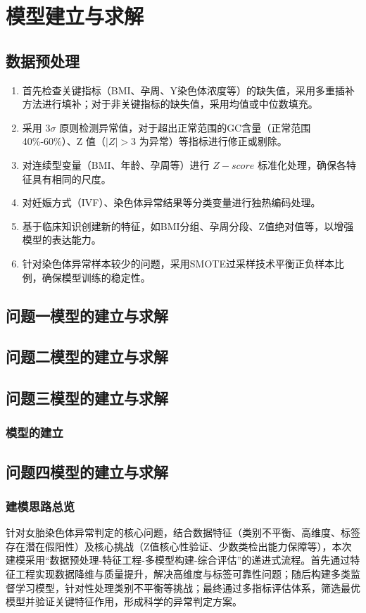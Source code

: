 \documentclass[withoutpreface,bwprint]{cumcmthesis} %
\begin{document}
\section{模型建立与求解}
\subsection{数据预处理}
\begin{enumerate}
    \item 首先检查关键指标（BMI、孕周、Y染色体浓度等）的缺失值，采用多重插补方法进行填补；对于非关键指标的缺失值，采用均值或中位数填充。
    \item 采用 $3\sigma$ 原则检测异常值，对于超出正常范围的GC含量（正常范围 40\%-60\%）、Z 值（$\vert Z\vert>3$ 为异常）等指标进行修正或剔除。
    \item 对连续型变量（BMI、年龄、孕周等）进行 $Z-score$ 标准化处理，确保各特征具有相同的尺度。
    \item 对妊娠方式（IVF）、染色体异常结果等分类变量进行独热编码处理。
    \item 基于临床知识创建新的特征，如BMI分组、孕周分段、Z值绝对值等，以增强模型的表达能力。
    \item 针对染色体异常样本较少的问题，采用SMOTE过采样技术平衡正负样本比例，确保模型训练的稳定性。
\end{enumerate}

\subsection{问题一模型的建立与求解}

\subsection{问题二模型的建立与求解}

\subsection{问题三模型的建立与求解}
\subsubsection{模型的建立}


\subsection{问题四模型的建立与求解}
\subsubsection{建模思路总览}
针对女胎染色体异常判定的核心问题，结合数据特征（类别不平衡、高维度、标签存在潜在假阳性）及核心挑战（Z值核心性验证、少数类检出能力保障等），本次建模采用“数据预处理-特征工程-多模型构建-综合评估”的递进式流程。首先通过特征工程实现数据降维与质量提升，解决高维度与标签可靠性问题；随后构建多类监督学习模型，针对性处理类别不平衡等挑战；最终通过多指标评估体系，筛选最优模型并验证关键特征作用，形成科学的异常判定方案。
\end{document}
